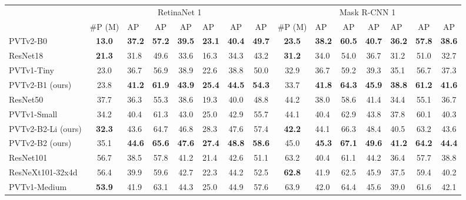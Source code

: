 \documentclass[10pt,twocolumn,letterpaper]{article}
\newlength\savedwidth
\newcommand\whline{\noalign{\global\savedwidth\arrayrulewidth\global\arrayrulewidth 0.8pt}\hline\noalign{\global\arrayrulewidth\savedwidth}}
\begin{document}
\begin{table*}[t]
\begin{tabular}{l|c|lcc|lcc|c|lcc|lcc}
\renewcommand{\arraystretch}{0.1}
\multirow{2}{*}{Backbone} &\multicolumn{7}{c|}{RetinaNet 1} &\multicolumn{7}{c}{Mask R-CNN 1} \\
\cline{2-15} 
& \#P (M) &AP &AP &AP &AP &AP &AP &  \#P (M) &AP &AP &AP  &AP &AP &AP\\
\whline
PVTv2-B0 & \textbf{13.0}& \textbf{37.2} & \textbf{57.2} & \textbf{39.5} & \textbf{23.1} & \textbf{40.4} & \textbf{49.7} &\textbf{23.5} & \textbf{38.2} & \textbf{60.5} &\textbf{40.7} & \textbf{36.2} & \textbf{57.8} & \textbf{38.6}  \\
\hline
ResNet18~\cite{he2016deep} &\textbf{21.3} & 31.8 & 49.6 & 33.6 & 16.3 & 34.3 & 43.2  &\textbf{31.2} & 34.0 & 54.0 & 36.7 & 31.2 & 51.0 & 32.7\\
PVTv1-Tiny~\cite{pvt} &23.0& {36.7}& {56.9}& {38.9}& {22.6}& {38.8} &{50.0}  &32.9 & {36.7} & {59.2} & {39.3} & {35.1} & {56.7} & {37.3} \\
PVTv2-B1 (ours) &23.8 & \textbf{41.2} & \textbf{61.9} & \textbf{43.9} & \textbf{25.4} & \textbf{44.5} & \textbf{54.3} &33.7 & \textbf{41.8} & \textbf{64.3} & \textbf{45.9} & \textbf{38.8} & \textbf{61.2} & \textbf{41.6} \\
\hline
ResNet50~\cite{he2016deep} &37.7 & 36.3 & 55.3 & 38.6 & 19.3 & 40.0 & 48.8 & 44.2&38.0 & 58.6 & 41.4 & 34.4 & 55.1 & 36.7\\
PVTv1-Small~\cite{pvt} & {34.2} & {40.4} & {61.3} & {43.0} & {25.0} & {42.9} & {55.7} &{44.1} &{40.4} & {62.9} & {43.8} & {37.8} & {60.1} & {40.3}\\
PVTv2-B2-Li (ours) &\textbf{32.3} & 43.6 &64.7 & 46.8 & 28.3 & 47.6 & 57.4 &\textbf{42.2} & 44.1 &66.3 & 48.4 & 40.5 & 63.2 & 43.6 \\
PVTv2-B2 (ours) &35.1 & \textbf{44.6} & \textbf{65.6} & \textbf{47.6} & \textbf{27.4} & \textbf{48.8} & \textbf{58.6} &45.0& \textbf{45.3} & \textbf{67.1} & \textbf{49.6} & \textbf{41.2} & \textbf{64.2} &\textbf{44.4} \\
\hline
ResNet101~\cite{he2016deep} &56.7  & 38.5 & 57.8 & 41.2 & 21.4 & 42.6 & 51.1  &63.2 & 40.4 & 61.1 & 44.2 & 36.4 & 57.7 & 38.8 \\
ResNeXt101-32x4d~\cite{xie2017aggregated} &56.4& 39.9 & 59.6 & 42.7 & 22.3 & 44.2 & 52.5 &\textbf{62.8} & 41.9 & 62.5 & {45.9} & 37.5 & 59.4 & 40.2 \\
PVTv1-Medium~\cite{pvt} &\textbf{53.9} & {41.9} & {63.1} & {44.3} & {25.0} & {44.9} & {57.6} &63.9 & {42.0} &{64.4} &45.6 &{39.0}& {61.6}& {42.1}\\

\end{tabular}
\end{table*}
\end{document}
